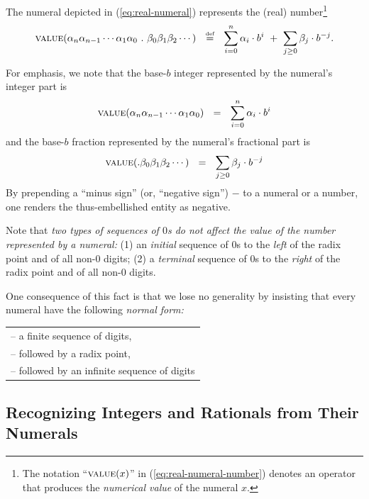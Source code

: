\noindent
The numeral depicted in (\ref{eq:real-numeral}) represents the (real)
number\footnote{The notation ``$\mbox{\sc value}(x)$'' in
  (\ref{eq:real-numeral-number}) denotes an operator that produces the
  {\em numerical value} of the numeral $x$.}
\begin{equation}
\label{eq:real-numeral-number}
\mbox{\sc value}(\alpha_n \alpha_{n-1} \cdots \alpha_1 \alpha_0                  
\ . \ \beta_0 \beta_1 \beta_2 \cdots)
\ \ \stackrel{\mbox{{\tiny def}}}{=} \ \
\sum_{i=0}^n \alpha_i \cdot b^i
\ + \ \sum_{j\geq 0} \beta_j \cdot b^{-j}.
\end{equation}

For emphasis, we note that the base-$b$ integer 
represented by the numeral's integer part is
\[
\mbox{\sc value}(\alpha_n \alpha_{n-1}\cdots \alpha_1 \alpha_0)
\ \ = \ \
\sum_{i=0}^n \alpha_i \cdot b^i
\]
and the base-$b$ fraction represented by the numeral's fractional part
is
\[
\mbox{\sc value}(. \beta_0 \beta_1 \beta_2 \cdots)
\ \ = \ \
\sum_{j\geq 0} \beta_j \cdot b^{-j}
\]
By prepending a ``minus sign'' (or, ``negative sign'') $-$ to a
numeral or a number, one renders the thus-embellished entity as
negative.

\medskip

Note that {\em two types of sequences of $0$s do not affect the value
  of the number represented by a numeral:} (1) an {\em initial}
sequence of $0$s to the {\em left} of the radix point and of all
non-$0$ digits; (2) a {\em terminal} sequence of $0$s to the {\em
  right} of the radix point and of all non-$0$ digits.

One consequence of this fact is that we lose no generality by
insisting that every numeral have the following {\em normal form:}

\smallskip

\hspace*{.15in}
\begin{tabular}{l}
-- a finite sequence of digits, \\
-- followed by a radix point, \\
-- followed by an infinite sequence of digits
\end{tabular}


\subsection{Recognizing Integers and  Rationals from Their Numerals}
\label{sec:special-numerals-N-Q}

